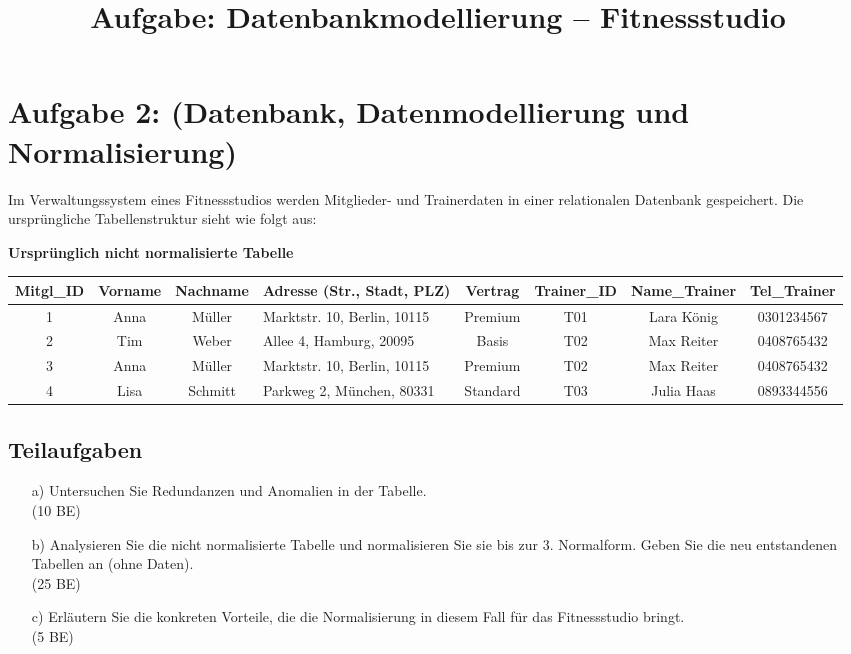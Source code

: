 \documentclass{article}
\title{Aufgabe: Datenbankmodellierung – Fitnessstudio}
\author{}
\date{}
\begin{document}
	\maketitle
	
	\section*{Aufgabe 2: (Datenbank, Datenmodellierung und Normalisierung)}
	
	Im Verwaltungssystem eines Fitnessstudios werden Mitglieder- und Trainerdaten in einer relationalen Datenbank gespeichert. Die ursprüngliche Tabellenstruktur sieht wie folgt aus:
	
	\textbf{Ursprünglich nicht normalisierte Tabelle}
	
	\begin{table}[h]
		\small
		\renewcommand{\arraystretch}{1.2}
		\begin{tabularx}{\textwidth}{|c|c|c|X|c|c|c|c|}
			\hline
			Mitgl\_ID & Vorname & Nachname & Adresse (Str., Stadt, PLZ) & Vertrag & Trainer\_ID & Name\_Trainer & Tel\_Trainer \\
			\hline
			1 & Anna & Müller & Marktstr. 10, Berlin, 10115 & Premium & T01 & Lara König & 0301234567 \\
			2 & Tim & Weber & Allee 4, Hamburg, 20095 & Basis & T02 & Max Reiter & 0408765432 \\
			3 & Anna & Müller & Marktstr. 10, Berlin, 10115 & Premium & T02 & Max Reiter & 0408765432 \\
			4 & Lisa & Schmitt & Parkweg 2, München, 80331 & Standard & T03 & Julia Haas & 0893344556 \\
			\hline
		\end{tabularx}
	\end{table}
	
	\subsection*{Teilaufgaben}
	
	\begin{enumerate}
		\item[a)] Untersuchen Sie Redundanzen und Anomalien in der Tabelle.\\ (10 BE)
		\item[b)] Analysieren Sie die nicht normalisierte Tabelle und normalisieren Sie sie bis zur 3. Normalform. Geben Sie die neu entstandenen Tabellen an (ohne Daten).\\ (25 BE)
		\item[c)] Erläutern Sie die konkreten Vorteile, die die Normalisierung in diesem Fall für das Fitnessstudio bringt.\\ (5 BE)
	\end{enumerate}
	
\end{document}
